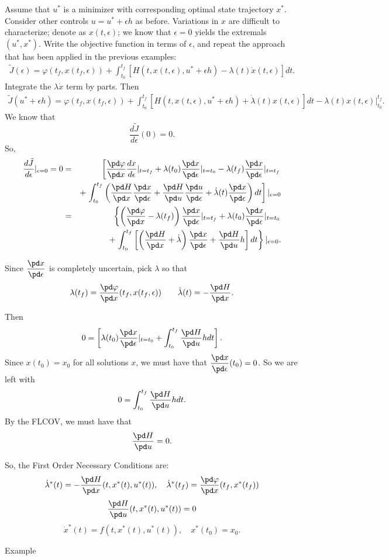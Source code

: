  Assume that $u^*$ is a minimizer with corresponding optimal state trajectory $x^*$. Consider other controls $u = u^*+\epsilon h$ as before. Variations in $x$ are difficult to characterize; denote as $x(t,\epsilon)$; we know that $\epsilon=0$ yields the extremals $(u^*, x^*)$.  Write the objective function in terms of $\epsilon$, and repeat the approach that has been applied in the previous examples:
 \begin{eqnarray*}
 {\tilde J}(\epsilon) = \varphi(t_f,x(t_f,\epsilon)) + \int_{t_0}^{t_f}[H(t,x(t,\epsilon),u^*+\epsilon h) - \lambda(t)\dot x(t,\epsilon)]dt .
 \end{eqnarray*}
 Integrate the $\lambda \dot x$ term by  parts. Then
 \begin{eqnarray*}
 {\tilde J}(u^* + \epsilon h) = \varphi(t_f,x(t_f,\epsilon)) + \int_{t_0}^{t_f}[H(t,x(t,\epsilon),u^*+\epsilon h) + \dot\lambda(t)x(t,\epsilon)]dt - \lambda(t) x(t,\epsilon)\vert_{t_0}^{t_f}.
 \end{eqnarray*}
 We know that $$ \frac{d {\tilde J}}{d\epsilon}(0) = 0.$$ So,
  \begin{eqnarray*}
 \frac{d {\tilde J}}{d\epsilon}\vert_{\epsilon=0} = 0&=&\left[ \frac{\pd\varphi}{\pd x}\frac{dx}{d\epsilon}\vert_{t = t_f} + \lambda(t_0)\frac{\pd x}{\pd\epsilon}\vert_{t=t_0} - \lambda(t_f)\frac{\pd x}{\pd\epsilon}\vert_{t=t_f} \right.\\
 &&+ \left.\int_{t_0}^{t_f}\left(\frac{\pd H}{\pd x} \frac{\pd x}{\pd\epsilon} +  \frac{\pd H}{\pd u} \frac{\pd u}{\pd\epsilon} + \dot\lambda(t)\frac{\pd x}{\pd\epsilon}\right)dt\right]\vert_{\epsilon=0} \\
 &=&\left\{ \left(\frac{\pd\varphi}{\pd x}- \lambda(t_f)\right)\frac{\pd x}{\pd\epsilon}\vert_{t = t_f} + \lambda(t_0)\frac{\pd x}{\pd\epsilon}\vert_{t=t_0} \right.\\
 &&+ \left.\int_{t_0}^{t_f}\left[\left(\frac{\pd H}{\pd x} +\dot\lambda\right)\frac{\pd x}{\pd\epsilon} +  \frac{\pd H}{\pd u}h  \right]dt\right\}\vert_{\epsilon=0} .
 \end{eqnarray*}

Since $\displaystyle \frac{\pd x}{\pd \epsilon}$ is completely uncertain, pick $\lambda$ so that
$$\lambda(t_f)=\frac{\pd \varphi}{\pd x} (t_f,x(t_f,\epsilon))\qquad \dot\lambda(t) = -\frac{\pd H}{\pd x}.$$

Then
$$ 0 = \left[ \lambda(t_0)\frac{\pd x}{\pd\epsilon}\vert_{t=t_0}
+ \int_{t_0}^{t_f}  \frac{\pd H}{\pd u}h  dt\right].$$
Since $x(t_0)=x_0$ for all solutions $x$, we must have that $\displaystyle\frac{\pd x}{\pd \epsilon}(t_0) = 0$. So we are left with
$$ 0 =  \int_{t_0}^{t_f}  \frac{\pd H}{\pd u}h  dt .$$
By the FLCOV, we must have that 
$$\frac{\pd H}{\pd u}=0.$$

So, the First Order Necessary Conditions are:
$$\dot\lambda^*(t) = -\frac{\pd H}{\pd x}(t, x^*(t),u^*(t)), \quad \dot\lambda^*(t_f) = \frac{\pd \varphi}{\pd x}(t_f, x^*(t_f))$$
$$ \frac{\pd H}{\pd u}(t, x^*(t),u^*(t)) = 0$$
$$\dot x^*(t) = f(t, x^*(t),u^*(t)), \quad x^*(t_0) = x_0. $$

\medskip
Example
\newpage
